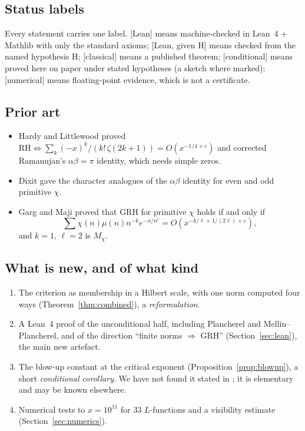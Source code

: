\documentclass[11pt]{amsart}
\theoremstyle{definition}
\theoremstyle{remark}
\newcommand{\status}[1]{\textsf{\small[#1]}}
\begin{document}
\subsection*{Status labels}
Every statement carries one label. \status{Lean} means machine-checked in Lean~4 + Mathlib with only the standard
axioms; \status{Lean, given H} means checked from the named hypothesis H; \status{classical} means a published theorem;
\status{conditional} means proved here on paper under stated hypotheses (a sketch where marked); \status{numerical}
means floating-point evidence, which is not a certificate.

\subsection*{Prior art}
\begin{itemize}[leftmargin=1.5em]
\item Hardy and Littlewood \cite{HL} proved $\mathrm{RH}\iff\sum_k(-x)^k/(k!\,\zeta(2k+1))=O(x^{-1/4+\varepsilon})$ and
corrected Ramanujan's $\alpha\beta=\pi$ identity, which needs simple zeros.
\item Dixit \cite{Dixit} gave the character analogues of the $\alpha\beta$ identity for even and odd primitive $\chi$.
\item Garg and Maji \cite{GM} proved that GRH for primitive $\chi$ holds if and only if
\[\textstyle\sum\chi(n)\mu(n)n^{-k}e^{-x/n^\ell}=O(x^{-k/\ell+1/(2\ell)+\varepsilon}),\]
and $k=1$, $\ell=2$ is $M_\chi$.
\end{itemize}

\subsection*{What is new, and of what kind}
\begin{enumerate}[leftmargin=1.5em]
\item The criterion as membership in a Hilbert scale, with one norm computed four ways (Theorem~\ref{thm:combined}),
a \emph{reformulation}.
\item A Lean~4 proof of the unconditional half, including Plancherel and Mellin--Plancherel, and of the
direction ``finite norms $\Rightarrow$ GRH'' (Section~\ref{sec:lean}), the main new artefact.
\item The blow-up constant at the critical exponent (Proposition~\ref{prop:blowup}), a short \emph{conditional
corollary}. We have not found it stated in \cite{HL,Dixit,GM}; it is elementary and may be known elsewhere.
\item Numerical tests to $x=10^{11}$ for 33 $L$-functions and a visibility estimate (Section~\ref{sec:numerics}).
\end{enumerate}
\end{document}
